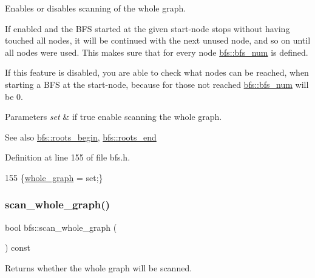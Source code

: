 Enables or disables scanning of the whole graph. 

If enabled and the B\+FS started at the given start-\/node stops without having touched all nodes, it will be continued with the next unused node, and so on until all nodes were used. This makes sure that for every node \mbox{\hyperlink{classbfs_a6205cc191bc0bedf1ff9d74af0925735}{bfs\+::bfs\+\_\+num}} is defined.

If this feature is disabled, you are able to check what nodes can be reached, when starting a B\+FS at the start-\/node, because for those not reached \mbox{\hyperlink{classbfs_a6205cc191bc0bedf1ff9d74af0925735}{bfs\+::bfs\+\_\+num}} will be 0.


\begin{DoxyParams}{Parameters}
{\em set} & if true enable scanning the whole graph. \\
\hline
\end{DoxyParams}
\begin{DoxySeeAlso}{See also}
\mbox{\hyperlink{classbfs_a45d58d06d0dcd6427edad2ec52a6ebb9}{bfs\+::roots\+\_\+begin}}, \mbox{\hyperlink{classbfs_ac84b90f777adeb90390689db62602d73}{bfs\+::roots\+\_\+end}} 
\end{DoxySeeAlso}


Definition at line 155 of file bfs.\+h.


\begin{DoxyCode}
155 \{\mbox{\hyperlink{classbfs_a6c08fbcc90d71f1cbdd03a1cdaa9dc99}{whole\_graph}} = \textcolor{keyword}{set};\}
\end{DoxyCode}
\mbox{\label{classbfs_a1378f5cfbc59b036e9215c02563bac23}} 
\subsubsection{\texorpdfstring{scan\+\_\+whole\+\_\+graph()}{scan\_whole\_graph()}\hspace{0.1cm}{\footnotesize\ttfamily [2/2]}}
{\footnotesize\ttfamily bool bfs\+::scan\+\_\+whole\+\_\+graph (\begin{DoxyParamCaption}{ }\end{DoxyParamCaption}) const\hspace{0.3cm}{\ttfamily [inline]}}



Returns whether the whole graph will be scanned. 


